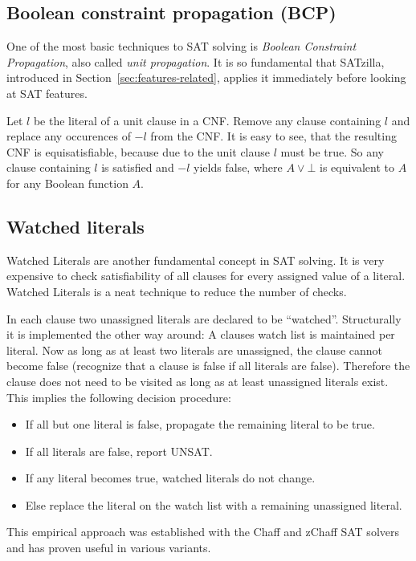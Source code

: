 \subsection{Boolean constraint propagation (BCP)}
\label{sec:sat-bcp}
%
One of the most basic techniques to SAT solving is \emph{Boolean Constraint Propagation},
also called \emph{unit propagation}.
It is so fundamental that SATzilla, introduced in Section~\ref{sec:features-related},
applies it immediately before looking at SAT features.

Let $l$ be the literal of a unit clause in a CNF. Remove any clause containing
$l$ and replace any occurences of $-l$ from the CNF. It is easy to see, that
the resulting CNF is equisatisfiable, because due to the unit clause $l$ must
be true. So any clause containing $l$ is satisfied and $-l$ yields false,
where $A \lor \bot$ is equivalent to $A$ for any Boolean function $A$.

\subsection{Watched literals}
\label{sec:sat-wl}
%
Watched Literals are another fundamental concept in SAT solving. It is very
expensive to check satisfiability of all clauses for every assigned value
of a literal. Watched Literals is a neat technique to reduce the number of checks.

In each clause two unassigned literals are declared to be \enquote{watched}.
Structurally it is implemented the other way around:
A clauses watch list is maintained per literal.
Now as long as at least two literals are unassigned, the clause cannot become
false (recognize that a clause is false if all literals are false).
Therefore the clause does not need to be visited as long as at least
unassigned literals exist. This implies the following decision procedure:
\begin{itemize}
  \item If all but one literal is false, propagate the remaining literal to be true.
  \item If all literals are false, report UNSAT.
  \item If any literal becomes true, watched literals do not change.
  \item Else replace the literal on the watch list with a remaining unassigned literal.
\end{itemize}

This empirical approach was established with the Chaff and zChaff SAT
solvers~\cite{moskewicz2001chaff} and has proven useful in various variants.


